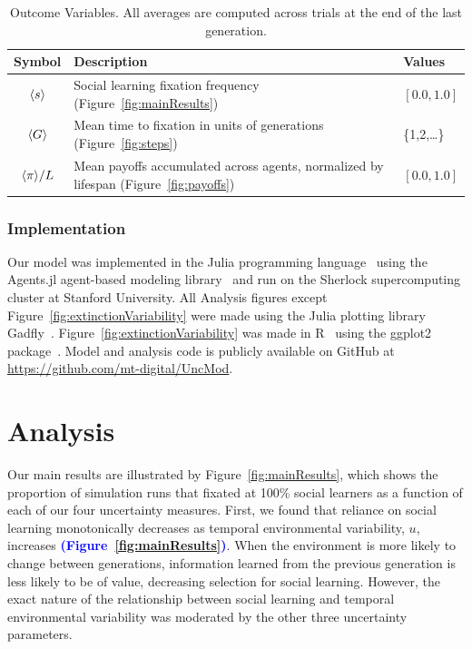 \documentclass[letterpaper,11.5pt]{scrartcl}
\newcommand{\edit}[1]{{\bfseries \textcolor{blue} {#1}}}
\begin{document}
\begin{table}[h]
    \caption{Outcome Variables. All averages are computed across trials at the end of the last generation.}
    \label{tab:outcomeVariables}
    \centering %
    \begin{tabular}{clp{0.85in}} \toprule

        Symbol & Description & Values \\ 

        \midrule  

        $\langle s \rangle$ & Social learning fixation frequency (Figure~\ref{fig:mainResults})
                  &  $[0.0, 1.0]$ \\

        $\langle G \rangle$ & Mean time to fixation in units of generations (Figure~\ref{fig:steps}) & \{1,2,\ldots\} \\

        $\langle \pi \rangle / L$ & Mean payoffs accumulated across agents, normalized by
        lifespan (Figure~\ref{fig:payoffs}) & $ [0.0, 1.0]$ \\

        \bottomrule
    \end{tabular}
\end{table}





\subsubsection{Implementation}

Our model was implemented in the Julia programming language~\citep{Bezanson2017} 
using the Agents.jl agent-based modeling library~\citep{Datseris2022} and run
on the Sherlock supercomputing cluster at Stanford University. All Analysis figures
except Figure~\ref{fig:extinctionVariability} were made using the Julia plotting
library Gadfly~\citep{Jones2021b}. Figure~\ref{fig:extinctionVariability} was made in R~\citep{R}
using the ggplot2 package~\citep{ggplot2}. 
Model and analysis code is publicly available on GitHub at \url{https://github.com/mt-digital/UncMod}.


\section{Analysis}

Our main results are illustrated by Figure~\ref{fig:mainResults}, which shows the
proportion of simulation runs that fixated at 100\% social learners as a function of
each of our four uncertainty measures. First, we found that reliance on social
learning monotonically decreases as temporal environmental variability, $u$,
increases \edit{(Figure~\ref{fig:mainResults})}. 
When the environment is more likely to change between generations,
information learned from the previous generation is less likely to be of value,
decreasing selection for social learning.  
However, the exact nature of the relationship between social
learning and temporal environmental variability was moderated by the other three uncertainty parameters. 
\end{document}
